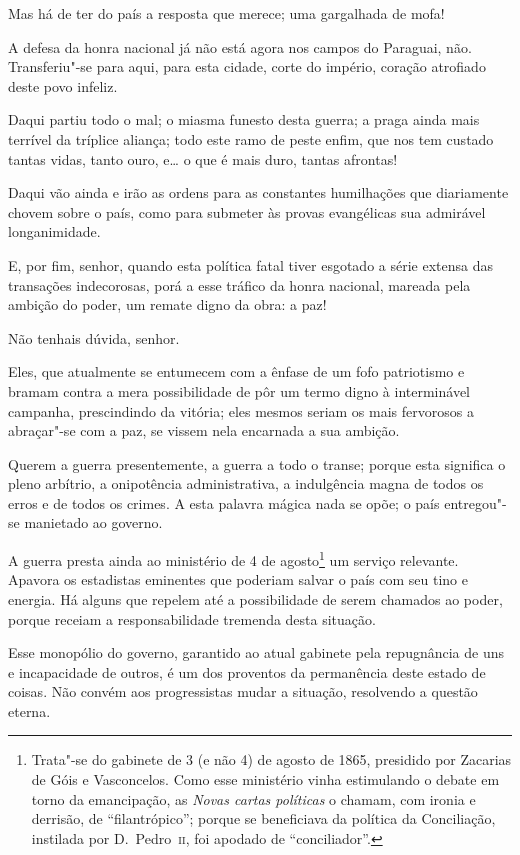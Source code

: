 Mas há de ter do país a resposta que merece; uma gargalhada de mofa!

 A defesa da honra nacional já não está agora nos campos do Paraguai,
não. Transferiu"-se para aqui, para esta cidade, corte do império,
coração atrofiado deste povo infeliz. 

 Daqui partiu todo o mal; o miasma funesto desta guerra; a praga ainda
mais terrível da tríplice aliança; todo este ramo de peste enfim, que
nos tem custado tantas vidas, tanto ouro, e\ldots{} o que é mais duro,
tantas afrontas!

 Daqui vão ainda e irão as ordens para as constantes humilhações que
diariamente chovem sobre o país, como para submeter às provas
evangélicas sua admirável longanimidade.

 E, por fim, senhor, quando esta política fatal tiver esgotado a série
extensa das transações indecorosas, porá a esse tráfico da honra
nacional, mareada pela ambição do poder, um remate digno da obra: a paz!

 Não tenhais dúvida, senhor.

 Eles, que atualmente se entumecem com a ênfase de um fofo patriotismo e
bramam contra a mera possibilidade de pôr um termo digno à interminável
campanha, prescindindo da vitória; eles mesmos seriam os mais
fervorosos a abraçar"-se com a paz, se vissem nela encarnada a sua
ambição. 

 Querem a guerra presentemente, a guerra a todo o transe; porque esta
significa o pleno arbítrio, a onipotência administrativa, a indulgência
magna de todos os erros e de todos os crimes. A esta palavra mágica
nada se opõe; o país entregou"-se manietado ao governo.

 A guerra presta ainda ao ministério de 4 de
agosto\footnote{ Trata"-se do gabinete de 3 (e não 4) de agosto de 1865, presidido por 
Zacarias de Góis e Vasconcelos. Como esse ministério vinha estimulando o debate em torno da 
emancipação, as \textit{Novas cartas políticas} o chamam, com ironia e derrisão, de ``filantrópico''; porque se 
beneficiava da política da Conciliação, instilada por D.~Pedro~\textsc{ii}, foi apodado de ``conciliador''.} 
um serviço relevante. Apavora os estadistas eminentes que poderiam
salvar o país com seu tino e energia. Há alguns que repelem até a
possibilidade de serem chamados ao poder, porque receiam a
responsabilidade tremenda desta situação. 

 Esse monopólio do governo, garantido ao atual gabinete pela repugnância
de uns e incapacidade de outros, é um dos proventos da permanência
deste estado de coisas. Não convém aos progressistas mudar a situação,
resolvendo a questão eterna. 


